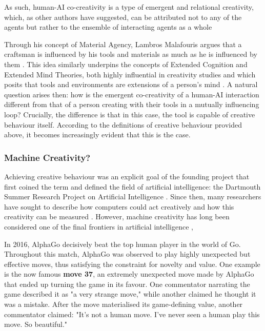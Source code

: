 As such, human-AI co-creativity is a type of emergent and relational creativity, which, as other authors have suggested, can be attributed not to any of the agents but rather to the ensemble of interacting agents as a whole \cite{Davis2013-jy, Rezwana2023-rt}

Through his concept of Material Agency, Lambros Malafouris argues that a craftsman is influenced by his tools and materials as much as he is influenced by them \cite{Malafouris2013-by}. This idea similarly underpins the concepts of Extended Cognition and Extended Mind Theories, both highly influential in creativity studies and which posits that tools and environments are extensions of a person's mind \cite{Clark1998-yi}. A natural question arises then: how is the emergent co-creativity of a human-AI interaction different from that of a person creating with their tools in a mutually influencing loop? Crucially, the difference is that in this case, the tool is capable of creative behaviour itself. According to the definitions of creative behaviour provided above, it becomes increasingly evident that this is the case. 

\subsubsection{Machine Creativity?}

Achieving creative behaviour was an explicit goal of the founding project that first coined the term and defined the field of artificial intelligence: the Dartmouth Summer Research Project on Artificial Intelligence \cite{McCarthy1955-ls}. Since then,  many researchers have sought to describe how computers could act creatively and how this creativity can be measured \cite{Boden2003-hk, Boden1998-yn, Colton2012-jc, Bown2012-gg, Moruzzi2020-mw, Wiggins2006-zd, Jordanous2012-kw}. However, machine creativity has long been considered one of the final frontiers in artificial intelligence \cite{Colton2021-bt},

In 2016, AlphaGo decisively beat the top human player in the world of Go. Throughout this match, AlphaGo was observed to play highly unexpected but effective moves, thus satisfying the constraint for novelty and value. One example is the now famous \textbf{move 37}, an extremely unexpected move made by AlphaGo that ended up turning the game in its favour. One commentator narrating the game described it as "a very strange move," while another claimed he thought it was a mistake. After the move materialised its game-defining value, another commentator claimed: "It’s not a human move. I’ve never seen a human play this move. So beautiful."

